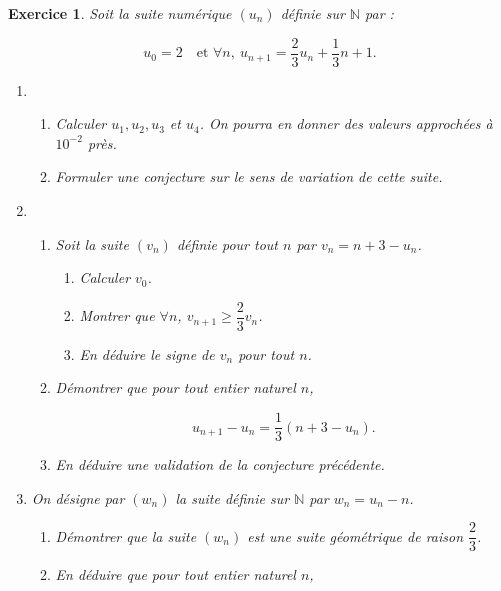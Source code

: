 \documentclass[10pt]{article}
\newcommand{\N}{\mathbb{N}}
\theoremstyle{exostyle}
\newtheorem{exercice}{Exercice}
\begin{document}
\begin{exercice}
    Soit la suite numérique $\left(u_{n}\right)$ définie sur $\N$ par :

    \[u_{0} = 2 \quad \text{et } \forall n, \:u_{n+1} = \dfrac{2}{3}u_{n} + \dfrac{1}{3}n + 1.\]

    \begin{enumerate}
        \item
              \begin{enumerate}
                  \item Calculer $u_{1}, u_{2}, u_{3}$ et $u_{4}$. On pourra en donner des valeurs approchées à $10^{- 2}$ près.
                  \item Formuler une conjecture sur le sens de variation de cette suite.
              \end{enumerate}

        \item
              \begin{enumerate}
                  \item Soit la suite $(v_n)$ définie pour tout $n$ par $v_{n} = n+3 - u_n$.
                        \begin{enumerate}
                            \item Calculer $v_0$.
                            \item Montrer que  $\forall n$, $v_{n+1}\geqslant \dfrac{2}{3}v_n$.
                            \item En déduire le signe de $v_n$ pour tout $n$.
                        \end{enumerate}
                  \item Démontrer que pour tout entier naturel $n$,

                        \[u_{n+1} - u_{n} = \dfrac{1}{3} \left(n + 3 - u_{n}\right).\]

                  \item En déduire une validation de la conjecture précédente.
              \end{enumerate}
        \item On désigne par $\left(w_{n}\right)$ la suite définie sur $\N$ par $w_{n} = u_{n} - n$.
              \begin{enumerate}
                  \item Démontrer que la suite $\left(w_{n}\right)$ est une suite géométrique de raison $\dfrac{2}{3}$.
                  \item En déduire que pour tout entier naturel $n$,


\end{enumerate}
\end{enumerate}
\end{exercice}
\end{document}
